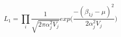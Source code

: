 \begin{equation}
\label{mle}
L_1 = \prod\limits_i\frac{1}{\sqrt{2\pi \alpha_j^2 V_j}}exp\Big(\frac{-(\beta_{1j}- \mu)^2}{2 \alpha_j^2 V_j}\Big)
\end{equation}